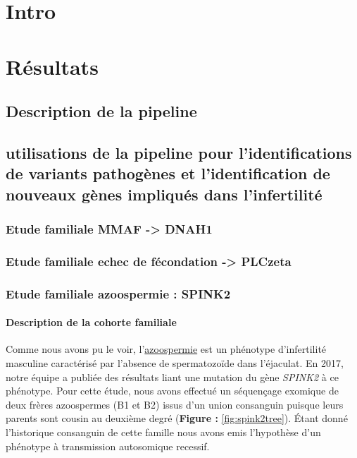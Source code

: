 \documentclass[12pt,twoside]{reedthesis}
\theoremstyle{definition}
\theoremstyle{definition}
\theoremstyle{remark}
\begin{document}
  \section{Intro}\label{intro}
  
  \section{Résultats}\label{resultats}
  
  \subsection{Description de la
  pipeline}\label{description-de-la-pipeline}
  
  \subsection{utilisations de la pipeline pour l'identifications de
  variants pathogènes et l'identification de nouveaux gènes impliqués dans
  l'infertilité}\label{utilisations-de-la-pipeline-pour-lidentifications-de-variants-pathogenes-et-lidentification-de-nouveaux-genes-impliques-dans-linfertilite}
  
  \subsubsection{Etude familiale MMAF -\textgreater{}
  DNAH1}\label{etude-familiale-mmaf---dnah1}
  
  \subsubsection{Etude familiale echec de fécondation -\textgreater{}
  PLCzeta}\label{etude-familiale-echec-de-fecondation---plczeta}
  
  \newpage  
  
  \subsubsection{Etude familiale azoospermie :
  SPINK2}\label{etude-familiale-azoospermie-spink2}
  
  \paragraph{Description de la cohorte
  familiale}\label{description-de-la-cohorte-familiale}
  
  Comme nous avons pu le voir, l'\protect\hyperlink{infquant}{azoospermie}
  est un phénotype d'infertilité masculine caractérisé par l'absence de
  spermatozoïde dans l'éjaculat. En 2017, notre équipe a publiée des
  résultats liant une mutation du gène \emph{SPINK2} à ce phénotype. Pour
  cette étude, nous avons effectué un séquençage exomique de deux frères
  azoospermes (B1 et B2) issus d'un union consanguin puisque leurs parents
  sont cousin au deuxième degré (\textbf{Figure : }\ref{fig:spink2tree}).
  Étant donné l'historique consanguin de cette famille nous avons emis
  l'hypothèse d'un phénotype à transmission autosomique recessif.
  
\end{document}
